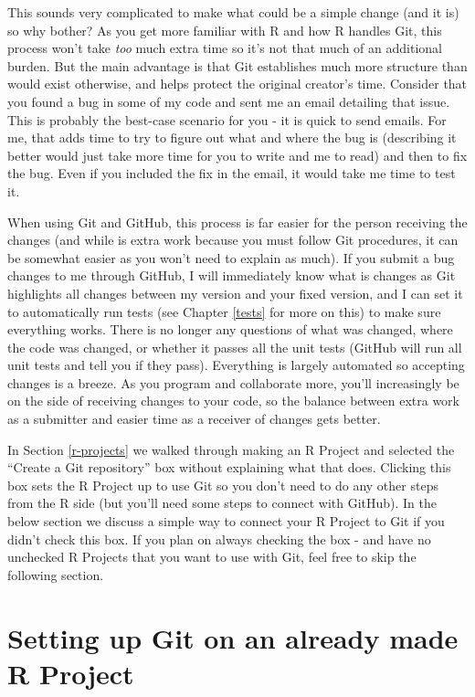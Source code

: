 \documentclass[
]{krantz}
\begin{document}
This sounds very complicated to make what could be a simple change (and it is) so why bother? As you get more familiar with R and how R handles Git, this process won't take \emph{too} much extra time so it's not that much of an additional burden. But the main advantage is that Git establishes much more structure than would exist otherwise, and helps protect the original creator's time. Consider that you found a bug in some of my code and sent me an email detailing that issue. This is probably the best-case scenario for you - it is quick to send emails. For me, that adds time to try to figure out what and where the bug is (describing it better would just take more time for you to write and me to read) and then to fix the bug. Even if you included the fix in the email, it would take me time to test it.

When using Git and GitHub, this process is far easier for the person receiving the changes (and while is extra work because you must follow Git procedures, it can be somewhat easier as you won't need to explain as much). If you submit a bug changes to me through GitHub, I will immediately know what is changes as Git highlights all changes between my version and your fixed version, and I can set it to automatically run tests (see Chapter \ref{tests} for more on this) to make sure everything works. There is no longer any questions of what was changed, where the code was changed, or whether it passes all the unit tests (GitHub will run all unit tests and tell you if they pass). Everything is largely automated so accepting changes is a breeze. As you program and collaborate more, you'll increasingly be on the side of receiving changes to your code, so the balance between extra work as a submitter and easier time as a receiver of changes gets better.

In Section \ref{r-projects} we walked through making an R Project and selected the ``Create a Git repository'' box without explaining what that does. Clicking this box sets the R Project up to use Git so you don't need to do any other steps from the R side (but you'll need some steps to connect with GitHub). In the below section we discuss a simple way to connect your R Project to Git if you didn't check this box. If you plan on always checking the box - and have no unchecked R Projects that you want to use with Git, feel free to skip the following section.

\hypertarget{setting-up-git-on-an-already-made-r-project}{%
\section{Setting up Git on an already made R Project}\label{setting-up-git-on-an-already-made-r-project}}
\end{document}
